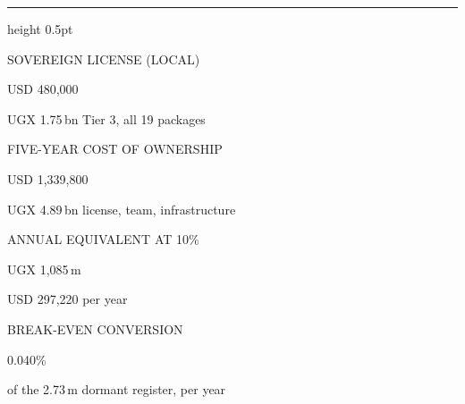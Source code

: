 \documentclass[10pt,a4paper]{article}
\begin{document}
\begin{titlepage}
\vfill
{\color{rulec}\hrule height 0.5pt}\vspace{5mm}
\noindent\begin{minipage}[t]{40mm}\RaggedRight
{\fontsize{6.2}{8}\selectfont\textcolor{inkiii}{SOVEREIGN LICENSE (LOCAL)}\par}\vspace{2.4mm}
{\datafont\fontsize{14}{14}\selectfont\textcolor{oxblood}{USD 480,000}\par}\vspace{2mm}
{\fontsize{7.6}{9.6}\selectfont\color{inkii}UGX 1.75\,bn \textperiodcentered{} Tier 3, all 19 packages\par}
\end{minipage}\hfill
\begin{minipage}[t]{43mm}\RaggedRight
{\fontsize{6.2}{8}\selectfont\textcolor{inkiii}{FIVE-YEAR COST OF OWNERSHIP}\par}\vspace{2.4mm}
{\datafont\fontsize{14}{14}\selectfont\textcolor{oxblood}{USD 1,339,800}\par}\vspace{2mm}
{\fontsize{7.6}{9.6}\selectfont\color{inkii}UGX 4.89\,bn \textperiodcentered{} license, team, infrastructure\par}
\end{minipage}\hfill
\begin{minipage}[t]{38mm}\RaggedRight
{\fontsize{6.2}{8}\selectfont\textcolor{inkiii}{ANNUAL EQUIVALENT AT 10\%}\par}\vspace{2.4mm}
{\datafont\fontsize{14}{14}\selectfont\textcolor{ink}{UGX 1,085\,m}\par}\vspace{2mm}
{\fontsize{7.6}{9.6}\selectfont\color{inkii}USD 297,220 per year\par}
\end{minipage}\hfill
\begin{minipage}[t]{38mm}\RaggedRight
{\fontsize{6.2}{8}\selectfont\textcolor{inkiii}{BREAK-EVEN CONVERSION}\par}\vspace{2.4mm}
{\datafont\fontsize{14}{14}\selectfont\textcolor{ink}{0.040\%}\par}\vspace{2mm}
{\fontsize{7.6}{9.6}\selectfont\color{inkii}of the 2.73\,m dormant register, per year\par}
\end{minipage}


\end{titlepage}
\end{document}

